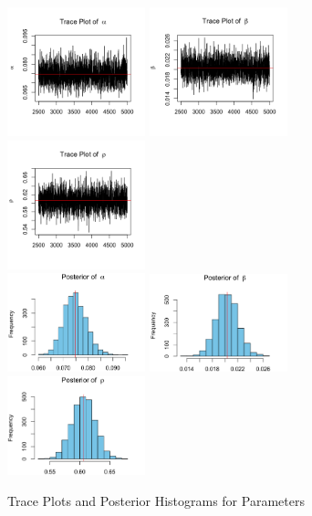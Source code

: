 \documentclass[11pt]{article}\usepackage[]{graphicx}\usepackage[]{color}
\newcommand{\bfig}{\begin{figure}}
\newcommand{\efig}{\end{figure}}
\begin{document}
{\bfig\centering
\includegraphics[width=4cm]{figures/gamma0505/a_trace.png}
\includegraphics[width=4cm]{figures/gamma0505/b_trace.png}
\includegraphics[width=4cm]{figures/gamma0505/p_trace.png}\\
\includegraphics[width=4cm]{figures/gamma0505/a_hist.png}
\includegraphics[width=4cm]{figures/gamma0505/b_hist.png}
\includegraphics[width=4cm]{figures/gamma0505/p_hist.png}
\caption{Trace Plots and Posterior Histograms for Parameters}
\label{Post1}
\efig

}
\end{document}
